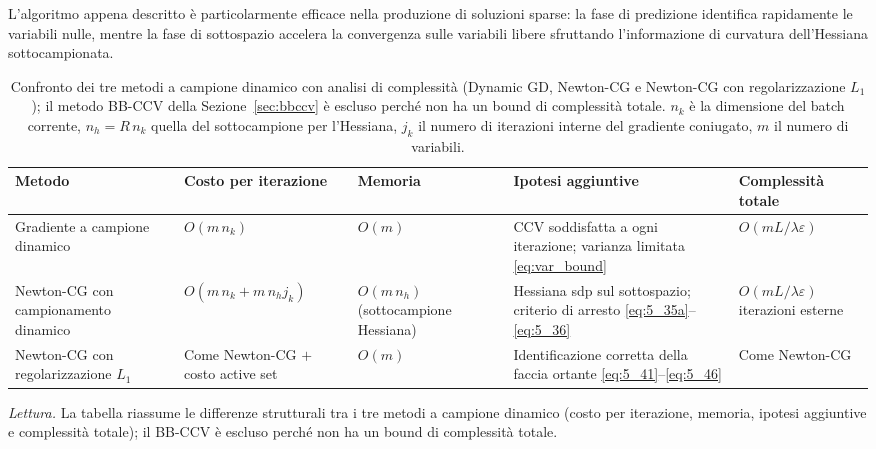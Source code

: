 \documentclass[a4paper,12pt]{article}
\numberwithin{equation}{section}
\numberwithin{figure}{section}
\numberwithin{table}{section}
\newenvironment{fitwidth}{%
  \begin{lrbox}{\fitbox}%
}{%
  \end{lrbox}%
  \ifdim\wd\fitbox>\textwidth
    \resizebox{\textwidth}{!}{\usebox{\fitbox}}%
  \else
    \usebox{\fitbox}%
  \fi
}
\begin{document}
\begin{notebox}
  L'algoritmo appena descritto è particolarmente efficace nella produzione di
  soluzioni sparse: la fase di predizione identifica rapidamente le variabili
  nulle, mentre la fase di sottospazio accelera la convergenza sulle variabili
  libere sfruttando l'informazione di curvatura dell'Hessiana sottocampionata.
\end{notebox}
\begin{table}[H]
\centering
\footnotesize
\renewcommand{\arraystretch}{1.5}
\setlength{\tabcolsep}{4pt}
\begin{fitwidth}
\begin{tabular}{@{}>{\raggedright\arraybackslash}p{2.5cm}
                >{\raggedright\arraybackslash}p{3.2cm}
                >{\raggedright\arraybackslash}p{2.0cm}
                >{\raggedright\arraybackslash}p{3.2cm}
                >{\raggedright\arraybackslash}p{2.4cm}@{}}
\toprule
Metodo & Costo per iterazione & Memoria
& Ipotesi aggiuntive & Complessit\`a totale \\
\midrule
Gradiente a campione dinamico &
$O(m\,n_k)$ &
$O(m)$ &
CCV soddisfatta a ogni iterazione; varianza limitata \eqref{eq:var_bound} &
$O(mL/\lambda\varepsilon)$ \\
Newton-CG con campionamento dinamico &
$O(m\,n_k + m\,n_h j_k)$ &
$O(m\,n_h)$ (sottocampione Hessiana) &
Hessiana sdp sul sottospazio; criterio di arresto \eqref{eq:5_35a}--\eqref{eq:5_36} &
$O(mL/\lambda\varepsilon)$ iterazioni esterne \\
Newton-CG con regolarizzazione $L_1$ &
Come Newton-CG $+$ costo active set &
$O(m)$ &
Identificazione corretta della faccia ortante \eqref{eq:5_41}--\eqref{eq:5_46} &
Come Newton-CG \\
\bottomrule
\end{tabular}
\end{fitwidth}
\caption{Confronto dei tre metodi a campione dinamico con analisi di
complessità (Dynamic GD, Newton-CG e Newton-CG con regolarizzazione $L_1$);
il metodo BB-CCV della Sezione~\ref{sec:bbccv} è escluso perché non ha un
bound di complessità totale. $n_k$ \`e la dimensione del batch corrente,
$n_h = R\,n_k$ quella del sottocampione per l'Hessiana, $j_k$ il numero di
iterazioni interne del gradiente coniugato, $m$ il numero di variabili.}
\label{tab:5_1}
\end{table}
\noindent\emph{Lettura.} La tabella riassume le differenze strutturali tra i tre metodi a campione dinamico (costo per iterazione, memoria, ipotesi aggiuntive e complessità totale); il BB-CCV è escluso perché non ha un bound di complessità totale.
\end{document}
